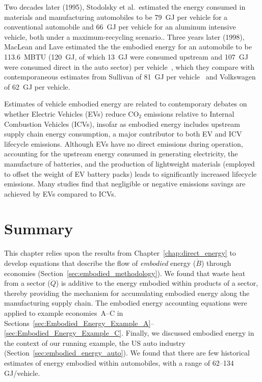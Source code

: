 Two decades later (1995), Stodolsky et al.\ estimated the energy consumed in materials and 
manufacturing automobiles to be 79~GJ per vehicle for a conventional automobile and 66~GJ per vehicle
for an aluminum intensive vehicle, both under a maximum-recycling
scenario.\cite[p.11]{Stodolsky1995}. 
Three years later (1998), MacLean and Lave estimated the the embodied energy
for an automobile to be 113.6~MBTU 
(120~GJ, of which 13~GJ were consumed upstream and 107~GJ were consumed direct
in the auto sector)
per vehicle~\cite[Figure~2]{MacLean1998}, 
which they compare with
contemporaneous estimates from Sullivan of 81~GJ per 
vehicle~\cite{Sullivan1995} and Volkswagen of 62~GJ
per vehicle.\cite{Schweimer1996}


Estimates of vehicle embodied energy are related 
to contemporary debates on whether 
Electric Vehicles (EVs) reduce CO$_2$ emissions
relative to Internal Combustion Vehicles (ICVs),
insofar as embodied energy includes upstream supply chain energy consumption,
a major contributor to both EV and ICV lifecycle emissions.
Although EVs have no direct emissions during operation,
accounting for the upstream energy consumed in generating electricity, 
the manufacture of batteries, 
and the production of lightweight materials 
(employed to offset the weight of EV battery packs)
leads to significantly increased lifecycle emissions.
Many studies find that negligible or negative emissions
savings are achieved by EVs compared to
ICVs.\cite{Anair:2012aa, Hawkins2012,zehner2013unclean}


\section{Summary}
\label{sec:embodied_energy_summary}

This chapter relies upon the results from Chapter~\ref{chap:direct_energy} to 
develop equations that describe the flow of 
\emph{embodied} energy ($\dot{B}$) through economies 
(Section~\ref{sec:embodied_methodology}).
We found that waste heat from a sector ($\dot{Q}$)
is additive to the energy embodied within products of a sector, 
thereby providing the mechanism for accumulating embodied energy 
along the manufacturing supply chain.
The embodied energy accounting equations were applied to example
economies~A--C %
in Sections~\ref{sec:Embodied_Energy_Example_A}--\ref{sec:Embodied_Energy_Example_C}. 
Finally, we discussed embodied energy in the context 
of our running example, the US auto industry (Section~\ref{sec:embodied_energy_auto}).
We found that there are few historical estimates of energy embodied within
automobiles, with a range of 62--134 GJ/vehicle.


